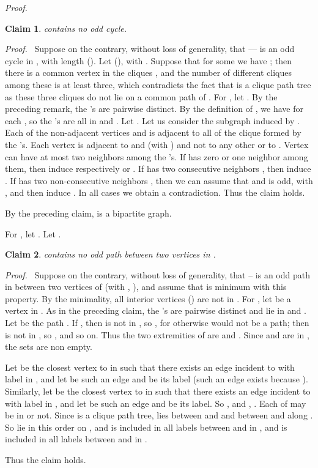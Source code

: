 \documentclass[11pt]{article}
\newtheorem{claim}{Claim}
\newenvironment{proof}{\noindent \emph{Proof.}\ }{\hfill
    \vspace{1em}}
\newenvironment{proofcl}{\noindent \emph{Proof.}\ }{Thus the claim
holds.  \hfill \vspace{1em}}
\begin{document}
\begin{proof}
\begin{claim}
 contains no odd cycle.
\end{claim}
\begin{proofcl}
Suppose on the contrary, without loss of generality, that
--- is an odd cycle in , with
length  ().  Let  (), with .  Suppose that for some  we
have ; then there is a common vertex in
the cliques , and the number of
different cliques among these is at least three, which contradicts the
fact that  is a clique path tree as these three cliques do not
lie on a common path of .  For , let .
By the preceding remark, the 's are pairwise distinct.  By the
definition of , we have  for each , so the 's are all in  and .  Let .  Let us consider the subgraph induced by .  Each of the non-adjacent vertices  and  is
adjacent to all of the clique formed by the 's.  Each vertex
 is adjacent to  and  (with ) and not to
any other  or to .  Vertex  can have at most two neighbors
among the 's.  If  has zero or one neighbor among them, then
 induce respectively
 or .  If  has two
consecutive neighbors , then  induce .  If  has two
non-consecutive neighbors , then we can assume that
 and  is odd,  with , and
then  induce
.  In all cases we obtain a contradiction.
\end{proofcl}


By the preceding claim,  is a bipartite graph.

For , let .  Let .
\begin{claim}
 contains no odd path between two vertices in .
\end{claim}
\begin{proofcl}
Suppose on the contrary, without loss of generality, that
-- is an odd path in  between two
vertices  of  (with , ), and assume that
 is minimum with this property.  By the minimality, all interior
vertices  () are not in .  For , let 
be a vertex in .  As in the preceding claim, the
's are pairwise distinct and lie in  and .  Let  be the
path .  If , then  is not in , so
, for otherwise  would not be a path; then 
is not in , so , and so on.  Thus the two extremities
of  are  and .  Since  and  are in , the sets  are non empty.



Let  be the closest vertex to  in  such that there
exists an edge incident to  with label in , and let
 be such an edge and  be its label (such an edge exists
because ).  Similarly, let  be the
closest vertex to  in  such that there exists an edge
incident to  with label in , and let  be
such an edge and  be its label.  So ,
 and , .
Each of  may be in  or not.  Since  is a clique path
tree,  lies between  and  and between  and 
along .  So  lie in this order on ,
and  is included in all labels between  and  in ,
and  is included in all labels between  and  in .


\end{proofcl}
\end{proof}
\end{document}
